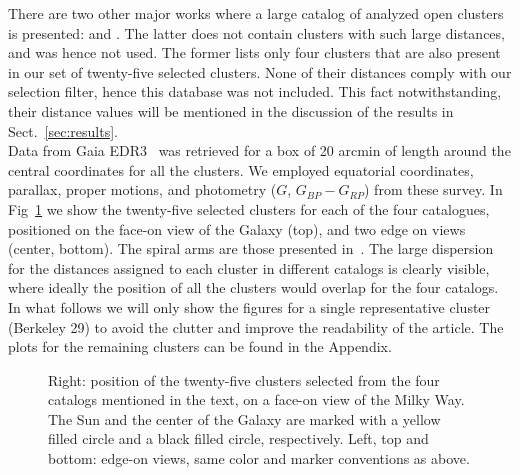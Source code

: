 \documentclass[draft]{aa}
\begin{document}
 There are two other major works where a large catalog of analyzed open clusters
 is presented: \cite{Lui_2019} and \cite{Dias_2021}. The latter does not contain
 clusters with such large distances, and was hence not used. The former lists
 only four clusters that are also present in our set of twenty-five selected
 clusters. None of their distances comply with our selection filter, hence this
 database was not included. This fact notwithstanding, their distance values will
 be mentioned in the discussion of the results in Sect.~\ref{sec:results}.\\

 Data from Gaia EDR3~\citep{Gaia_2016,Gaia_EDR3} was retrieved for a box of 20
 arcmin of length around the central coordinates for all the clusters. We
 employed equatorial coordinates, parallax, proper motions, and photometry
 ($G$, $G_{BP}-G_{RP}$) from these survey.
 In Fig~\ref{fig:MWmap} we show the twenty-five selected clusters for each of
 the four catalogues, positioned on the face-on view of the Galaxy (top), and
 two edge on views (center, bottom). The spiral arms are those presented
 in~\cite{Momany_2006}. The large dispersion for the distances
 assigned to each cluster in different catalogs is clearly visible, where
 ideally the position of all the clusters would overlap for the four catalogs.\\

 In what follows we will only show the figures for a single representative
 cluster (Berkeley 29) to avoid the clutter and improve the readability of the
 article. The plots for the remaining clusters can be found in the Appendix.

 \begin{figure}
  \caption{Right: position of the twenty-five clusters selected from the four
  catalogs mentioned in the text, on a face-on view of the Milky Way. The Sun
  and the center of the Galaxy are marked with a yellow filled circle and a
  black filled circle, respectively. Left, top and bottom: edge-on views,
  same color and marker conventions as above.}
  \label{fig:MWmap}
 \end{figure}
\end{document}
